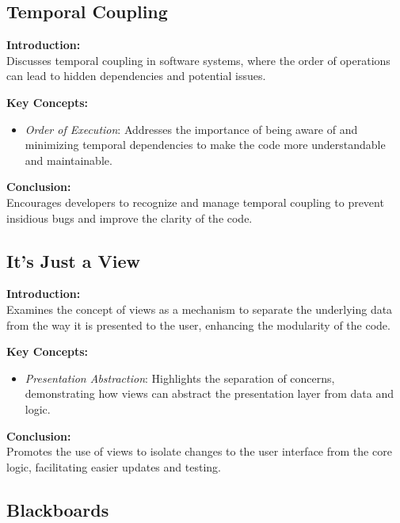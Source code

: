 \subsection{Temporal Coupling}

\textbf{Introduction:} \\
Discusses temporal coupling in software systems, where the order of operations can lead to hidden dependencies and potential issues.

\vspace{2mm}
\noindent\textbf{Key Concepts:}
\begin{itemize}
  \item \textit{Order of Execution}: Addresses the importance of being aware of and minimizing temporal dependencies to make the code more understandable and maintainable.
\end{itemize}

\vspace{2mm}
\noindent\textbf{Conclusion:} \\
Encourages developers to recognize and manage temporal coupling to prevent insidious bugs and improve the clarity of the code.

\subsection{It's Just a View}

\textbf{Introduction:} \\
Examines the concept of views as a mechanism to separate the underlying data from the way it is presented to the user, enhancing the modularity of the code.

\vspace{2mm}
\noindent\textbf{Key Concepts:}
\begin{itemize}
  \item \textit{Presentation Abstraction}: Highlights the separation of concerns, demonstrating how views can abstract the presentation layer from data and logic.
\end{itemize}

\vspace{2mm}
\noindent\textbf{Conclusion:} \\
Promotes the use of views to isolate changes to the user interface from the core logic, facilitating easier updates and testing.

\subsection{Blackboards}


